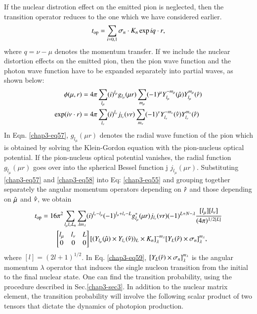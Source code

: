 If the nuclear distrotion effect on the emitted pion is neglected, then the transition operator reduces to the one which we have considered earlier.
\begin{equation}
t_{\text{op}} = \sum_{i=0, 1} \sigma_n \cdot {\boldmath K}_n \exp i {\boldmath q \cdot r}, \label{chap3-eq56}
\end{equation}
where $q= \nu -\mu$ denotes the momentum transfer. If we include the nuclear distortion effects on the emitted pion, then the pion wave function and the photon wave function have to be expanded separately into partial waves, as shown below:
\begin{align}
  \phi (\mu , {\boldmath r}) & = 4 \pi \sum_{l_{\mu}} (i)^{l_\mu} g_{l_\mu}(\mu r)\sum_{m_\mu} (-1)^\mu Y_{l_\mu}^{-m _\mu} ({\boldmath \hat{\mu}}) Y_{l_\mu}^{m_\mu} ({\boldmath \hat{r}}) \label{chap3=eq57}\\
  \exp (i \nu \cdot {\boldmath r}) & = 4 \pi \sum_{l_\nu} (i)^{l_\nu} j_{l_\nu} (\nu r) \sum_{m_\nu} (-1)^\nu Y_{l_\nu}^{-m_\nu} ({\boldmath \hat{\nu}}) Y_{l_\nu}^{m_\nu} ({\boldmath \hat{r}}) \label{chap3-eq58}
\end{align}
In Eqn. \eqref{chap3-eq57}, $g_{l_\mu} (\mu r)$ denotes the radial wave function of the pion which is obtained by solving the Klein-Gordon equation with the pion-nucleus optical potential. If the pion-nucleus optical potential vanishes, the radial function $g_{l_\mu}(\mu r)$ goes over into the spherical Bessel function j $j_{l_\mu}(\mu r)$. Substituting \eqref{chap3-eq57} and \eqref{chap3-eq58} into Eq: \eqref{chap3-eq55} and grouping together separately the angular momentum operators depending on ${\boldmath \hat{r}}$ and those depending on ${\boldmath \hat{\mu}}$ and ${\boldmath \hat{\nu}}$, we obtain
\begin{align}
  t_{\text{op}} & = 16\pi^2 \sum_{l_\mu l_\nu L_n} \sum_{\lambda m_\lambda} (i)^{l_\nu - l_\mu} (-1)^{l_\mu + l_\nu - L} g_{l_\mu}^\ast (\mu r)j_{l_\nu} (\nu r) (-1)^{L+N-\lambda} \frac{[l_\mu][l_\nu]}{(4 \pi)^{1/2 [L]}}\notag\\
  & \qquad \begin{bmatrix} l_\mu & l_\nu & L\\ 0 & 0 & 0   \end{bmatrix} [(Y_{l_\mu}(\hat{\mu}) \times Y_{l_\nu} (\hat{\nu}))_L \times {\boldmath K}_n]_\lambda^{-m_\lambda} [Y_L ({\boldmath \hat{r}}) \times \sigma_n]_{\lambda}^{m_\lambda}, \label{chap3-eq59}
\end{align}
where $[l] = (2l+1)^{1/2}$. In Eq. \eqref{chap3-eq59}, $[Y_L ({\boldmath \hat{r}}) \times \sigma_n]_\lambda^{m_\lambda}$ is the angular momentum $\lambda$ operator that induces the single nucleon transition from the initial to the final nuclear state. One can find the transition probability, using the procedure described in Sec.\ref{chap3-sec3}. In addition to the nuclear matrix element, the transition probability will involve the following scalar product of two tensors that dictate the dynamics of photopion production.
